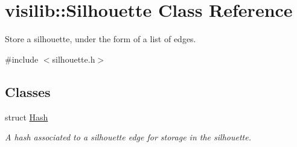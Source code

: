 \hypertarget{classvisilib_1_1_silhouette}{}\section{visilib\+::Silhouette Class Reference}
\label{classvisilib_1_1_silhouette}


Store a silhouette, under the form of a list of edges.  




{\ttfamily \#include $<$silhouette.\+h$>$}

\subsection*{Classes}
\begin{DoxyCompactItemize}
\item 
struct \mbox{\hyperlink{structvisilib_1_1_silhouette_1_1_hash}{Hash}}
\begin{DoxyCompactList}\small\item\em A hash associated to a silhouette edge for storage in the silhouette. \end{DoxyCompactList}\end{DoxyCompactItemize}
